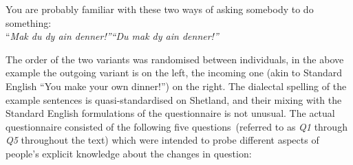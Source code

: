 \begin{framed}
\begin{center}
You are probably familiar with these two ways of asking somebody to do something:\\
``\emph{Mak du dy ain denner!''\hspace{3cm}``Du mak dy ain denner!''}
\end{center}
\end{framed}

The order of the two variants was randomised between individuals, in the above example the outgoing variant is on the left, the incoming one (akin to Standard English ``You make your own dinner!'') on the right. The dialectal spelling of the example sentences is quasi-standardised on Shetland, and their mixing with the Standard English formulations of the questionnaire is not unusual. The actual questionnaire consisted of the following five questions~(referred to as \emph{Q1} through \emph{Q5} throughout the text) which were intended to probe different aspects of people's explicit knowledge about the changes in question:


